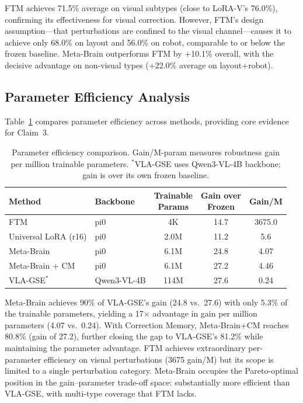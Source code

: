 \documentclass[conference]{article}
\newcommand{\ours}{Meta-Brain}
\begin{document}
FTM achieves 71.5\% average on visual subtypes (close to LoRA-V's 76.0\%), confirming its effectiveness for visual correction.
However, FTM's design assumption---that perturbations are confined to the visual channel---causes it to achieve only 68.0\% on layout and 56.0\% on robot, comparable to or below the frozen baseline.
\ours{} outperforms FTM by +10.1\% overall, with the decisive advantage on non-visual types (+22.0\% average on layout+robot).

\subsection{Parameter Efficiency Analysis}
\label{sec:param_eff}

Table~\ref{tab:param_eff} compares parameter efficiency across methods, providing core evidence for Claim~3.

\begin{table}[h]
\centering
\caption{Parameter efficiency comparison. Gain/M-param measures robustness gain per million trainable parameters. $^*$VLA-GSE uses Qwen3-VL-4B backbone; gain is over its own frozen baseline.}
\label{tab:param_eff}
\small
\begin{tabular}{llccc}
\toprule
Method & Backbone & \makecell{Trainable\\Params} & \makecell{Gain over\\Frozen} & Gain/M \\
\midrule
FTM & pi0 & 4K & 14.7 & 3675.0 \\
Universal LoRA (r16) & pi0 & 2.0M & 11.2 & 5.6 \\
\ours{} & pi0 & 6.1M & 24.8 & 4.07 \\
\ours{} + CM & pi0 & 6.1M & 27.2 & 4.46 \\
VLA-GSE$^*$ & Qwen3-VL-4B & 114M & 27.6 & 0.24 \\
\bottomrule
\end{tabular}
\end{table}

\ours{} achieves 90\% of VLA-GSE's gain (24.8 vs.\ 27.6) with only 5.3\% of the trainable parameters, yielding a 17$\times$ advantage in gain per million parameters (4.07 vs.\ 0.24).
With Correction Memory, \ours{}+CM reaches 80.8\% (gain of 27.2), further closing the gap to VLA-GSE's 81.2\% while maintaining the parameter advantage.
FTM achieves extraordinary per-parameter efficiency on visual perturbations (3675 gain/M) but its scope is limited to a single perturbation category.
\ours{} occupies the Pareto-optimal position in the gain--parameter trade-off space: substantially more efficient than VLA-GSE, with multi-type coverage that FTM lacks.
\end{document}
